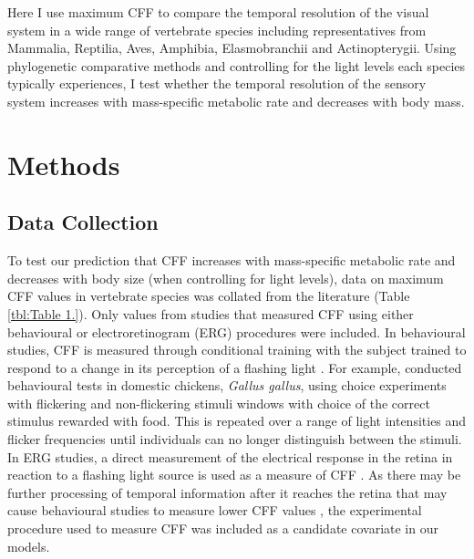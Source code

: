 Here I use maximum CFF to compare the temporal resolution of the visual system in a wide range of vertebrate species including representatives from Mammalia, Reptilia, Aves, Amphibia, Elasmobranchii and Actinopterygii. Using phylogenetic comparative methods and controlling for the light levels each species typically experiences, I test whether the temporal resolution of the sensory system increases with mass-specific metabolic rate and decreases with body mass.

\section{Methods}
\subsection{Data Collection}
To test our prediction that CFF increases with mass-specific metabolic rate and decreases with body size (when controlling for light levels), data on maximum CFF values in vertebrate species was collated from the literature (Table \ref{tbl:Table 1.}). Only values from studies that measured CFF using either behavioural or electroretinogram (ERG) procedures were included. In behavioural studies, CFF is measured through conditional training with the subject trained to respond to a change in its perception of a flashing light \citep{d1998can,rubene2010presence}. For example, \citep{lisney2011behavioural} conducted behavioural tests in domestic chickens, \textit{Gallus gallus}, using choice experiments with flickering and non-flickering stimuli windows with choice of the correct stimulus rewarded with food. This is repeated over a range of light intensities and flicker frequencies until individuals can no longer distinguish between the stimuli. In ERG studies, a direct measurement of the electrical response in the retina in reaction to a flashing light source is used as a measure of CFF \citep{d1998can,schwartz2010visual}. As there may be further processing of temporal information after it reaches the retina that may cause behavioural studies to measure lower CFF values \citep{d1998can}, the experimental procedure used to measure CFF was included as a candidate covariate in our models. 

